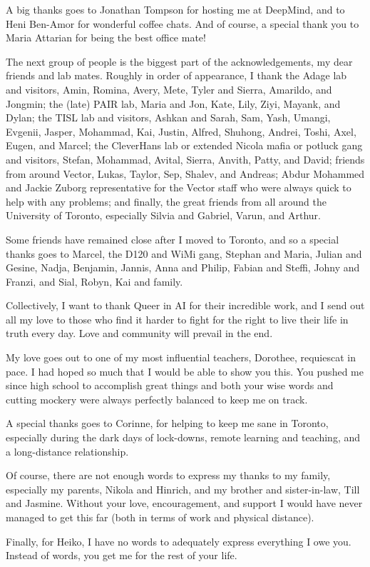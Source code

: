 A big thanks goes to Jonathan Tompson for hosting me at DeepMind, and to Heni Ben-Amor for wonderful coffee chats.
And of course, a special thank you to Maria Attarian for being the best office mate!

The next group of people is the biggest part of the acknowledgements, my dear friends and lab mates.
Roughly in order of appearance, I thank
the Adage lab and visitors, Amin, Romina, Avery, Mete, Tyler and Sierra, Amarildo, and Jongmin; the (late) PAIR lab, Maria and Jon, Kate, Lily, Ziyi, Mayank, and Dylan; the TISL lab and visitors, Ashkan and Sarah, Sam, Yash, Umangi, Evgenii, Jasper, Mohammad, Kai, Justin, Alfred, Shuhong, Andrei, Toshi, Axel, Eugen, and Marcel; the CleverHans lab or extended Nicola mafia or potluck gang and visitors, Stefan, Mohammad, Avital, Sierra, Anvith, Patty, and David; friends from around Vector, Lukas, Taylor, Sep, Shalev, and Andreas; Abdur Mohammed and Jackie Zuborg representative for the Vector staff who were always quick to help with any problems; and finally, the great friends from all around the University of Toronto, especially Silvia and Gabriel, Varun, and Arthur.

Some friends have remained close after I moved to Toronto, and so a special thanks goes to Marcel, the D120 and WiMi gang, Stephan and Maria, Julian and Gesine, Nadja, Benjamin, Jannis, Anna and Philip, Fabian and Steffi, Johny and Franzi, and Sial, Robyn, Kai and family.

Collectively, I want to thank Queer in AI for their incredible work, and I send out all my love to those who find it harder to fight for the right to live their life in truth every day.
Love and community will prevail in the end.

My love goes out to one of my most influential teachers, Dorothee, requiescat in pace.
I had hoped so much that I would be able to show you this.
You pushed me since high school to accomplish great things and both your wise words and cutting mockery were always perfectly balanced to keep me on track.

A special thanks goes to Corinne, for helping to keep me sane in Toronto, especially during the dark days of lock-downs, remote learning and teaching, and a long-distance relationship.

Of course, there are not enough words to express my thanks to my family, especially my parents, Nikola and Hinrich, and my brother and sister-in-law, Till and Jasmine.
Without your love, encouragement, and support I would have never managed to get this far (both in terms of work and physical distance).

Finally, for Heiko, I have no words to adequately express everything I owe you.
Instead of words, you get me for the rest of your life.
